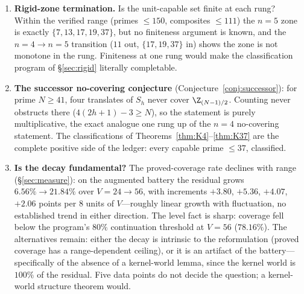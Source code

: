 \begin{enumerate}[leftmargin=1.7em,itemsep=4pt]
  three-distance foot count, clean at every prime $p\ge31$ and
  cross-checked against the census to $p\le419$; the two-foot version is
  consumed by no current proof --- leaving the
  pinning-size lemma (relative-offset sets of at most $6$ elements with
  covering counts $28$ and $68$ independent of $p$, verified to
  $p\le113$, needed by the shear-rigidity closure, and now confirmed from
  the $pq$ side by Proposition~\ref{prop:pqpinned}) as the programme's
  single unbounded input, dischargeable not by
  bounded search but by the four-family covering classification
  (Conjecture~\ref{conj:SL}) --- which is the programme's route to an
  unconditional-in-$p$ statement.

\item \textbf{Rigid-zone termination.} Is the unit-capable set finite at
  each rung? Within the verified range (primes $\le 150$, composites
  $\le 111$) the $n=5$ zone is exactly $\{7,13,17,19,37\}$, but no
  finiteness argument is known, and the $n=4\to n=5$ transition
  ($11$ out, $\{17,19,37\}$ in) shows the zone is not monotone in the
  rung. Finiteness at one rung would make the classification program of
  \S\ref{sec:rigid} literally completable.

\item \textbf{The successor no-covering conjecture}
  (Conjecture~\ref{conj:successor}): for prime $N\ge 41$, four
  translates of $S_h$ never cover $\Z_{(N-1)/2}$. Counting never
  obstructs there ($4(2h+1)-3\ge N$), so the statement is purely
  multiplicative, the exact analogue one rung up of the $n=4$
  no-covering statement. The classifications of
  Theorems~\ref{thm:K4}--\ref{thm:K37} are the complete positive side of
  the ledger: every capable prime $\le 37$, classified.

\item \textbf{Is the decay fundamental?} The proved-coverage rate
  declines with range (\S\ref{sec:measure}): on the augmented battery
  the residual grows $6.56\%\to21.84\%$ over $V=24\to56$, with
  increments $+3.80$, $+5.36$, $+4.07$, $+2.06$ points per $8$ units of
  $V$---roughly linear growth with fluctuation, no established trend in
  either direction. The level fact is sharp: coverage fell below the
  program's $80\%$ continuation threshold at $V=56$ ($78.16\%$). The
  alternatives remain: either the decay is intrinsic to the
  reformulation (proved coverage has a range-dependent ceiling), or it
  is an artifact of the battery---specifically of the absence of a
  kernel-world lemma, since the kernel world is $100\%$ of the residual.
  Five data points do not decide the question; a kernel-world structure
  theorem would.


\end{enumerate}
